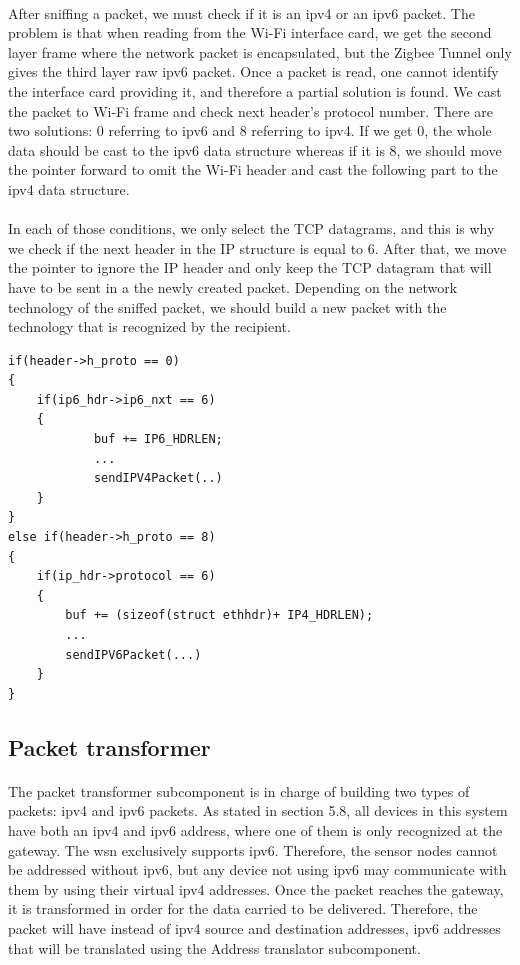 \documentclass[12pt,a4paper,final]{report}
\begin{document}
\paragraph{}
After sniffing a packet, we must check if it is an \gls{ipv4} or an \gls{ipv6} packet. The problem is that when reading from the Wi-Fi interface card, we get the second layer frame where the network packet is encapsulated, but the Zigbee Tunnel only gives the third layer raw \gls{ipv6} packet. Once a packet is read, one cannot identify the interface card providing it, and therefore a partial solution is found. We cast the packet to Wi-Fi frame and check next header's protocol number. There are two solutions: 0 referring to \gls{ipv6} and 8 referring to \gls{ipv4}.
If we get 0, the whole data should be cast to the \gls{ipv6} data structure whereas if it is 8, we should move the pointer forward to omit the Wi-Fi header and cast the following part to the \gls{ipv4} data structure.
\paragraph{}
In each of those conditions, we only select the TCP datagrams, and this is why we check if the next header in the IP structure is equal to 6. After that, we move the pointer to ignore the IP header and only keep the TCP datagram that will have to be sent in a the newly created packet. Depending on the network technology of the sniffed packet, we should build a new packet with the technology that is recognized by the recipient.
\newpage
\begin{singlespacing}
\begin{lstlisting}
if(header->h_proto == 0) 
{
	if(ip6_hdr->ip6_nxt == 6)
	{
			buf += IP6_HDRLEN;
			... 			
			sendIPV4Packet(..)
	}
}
else if(header->h_proto == 8)
{
	if(ip_hdr->protocol == 6)
	{
		buf += (sizeof(struct ethhdr)+ IP4_HDRLEN);		
		...
		sendIPV6Packet(...)
	}
}
\end{lstlisting}
\end{singlespacing}

\subsection{Packet transformer}
\paragraph{}
The packet transformer subcomponent is in charge of building two types of packets: \gls{ipv4} and \gls{ipv6} packets. As stated in section 5.8, all devices in this system have both an \gls{ipv4} and \gls{ipv6} address, where one of them is only recognized at the gateway. The \gls{wsn} exclusively supports \gls{ipv6}. Therefore, the sensor nodes cannot be addressed without \gls{ipv6}, but any device not using \gls{ipv6} may communicate with them by using their virtual \gls{ipv4} addresses. Once the packet reaches the gateway, it is transformed in order for the data carried to be delivered. Therefore, the packet will have instead of \gls{ipv4} source and destination addresses, \gls{ipv6} addresses that will be translated using the Address translator subcomponent.
\end{document}
